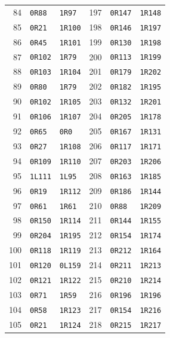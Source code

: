 \begin{longtable}{@{}rll@{\qquad\qquad}rll@{}}
84 & \texttt{0R88} & \texttt{1R97} & 197 & \texttt{0R147} & \texttt{1R148}\\
85 & \texttt{0R21} & \texttt{1R100} & 198 & \texttt{0R146} & \texttt{1R197}\\
86 & \texttt{0R45} & \texttt{1R101} & 199 & \texttt{0R130} & \texttt{1R198}\\
87 & \texttt{0R102} & \texttt{1R79} & 200 & \texttt{0R113} & \texttt{1R199}\\
88 & \texttt{0R103} & \texttt{1R104} & 201 & \texttt{0R179} & \texttt{1R202}\\
89 & \texttt{0R80} & \texttt{1R79} & 202 & \texttt{0R182} & \texttt{1R195}\\
90 & \texttt{0R102} & \texttt{1R105} & 203 & \texttt{0R132} & \texttt{1R201}\\
91 & \texttt{0R106} & \texttt{1R107} & 204 & \texttt{0R205} & \texttt{1R178}\\
92 & \texttt{0R65} & \texttt{0R0} & 205 & \texttt{0R167} & \texttt{1R131}\\
93 & \texttt{0R27} & \texttt{1R108} & 206 & \texttt{0R117} & \texttt{1R171}\\
94 & \texttt{0R109} & \texttt{1R110} & 207 & \texttt{0R203} & \texttt{1R206}\\
95 & \texttt{1L111} & \texttt{1L95} & 208 & \texttt{0R163} & \texttt{1R185}\\
96 & \texttt{0R19} & \texttt{1R112} & 209 & \texttt{0R186} & \texttt{1R144}\\
97 & \texttt{0R61} & \texttt{1R61} & 210 & \texttt{0R88} & \texttt{1R209}\\
98 & \texttt{0R150} & \texttt{1R114} & 211 & \texttt{0R144} & \texttt{1R155}\\
99 & \texttt{0R204} & \texttt{1R195} & 212 & \texttt{0R154} & \texttt{1R174}\\
100 & \texttt{0R118} & \texttt{1R119} & 213 & \texttt{0R212} & \texttt{1R164}\\
101 & \texttt{0R120} & \texttt{0L159} & 214 & \texttt{0R211} & \texttt{1R213}\\
102 & \texttt{0R121} & \texttt{1R122} & 215 & \texttt{0R210} & \texttt{1R214}\\
103 & \texttt{0R71} & \texttt{1R59} & 216 & \texttt{0R196} & \texttt{1R196}\\
104 & \texttt{0R58} & \texttt{1R123} & 217 & \texttt{0R154} & \texttt{1R216}\\
105 & \texttt{0R21} & \texttt{1R124} & 218 & \texttt{0R215} & \texttt{1R217}\\

\end{longtable}

